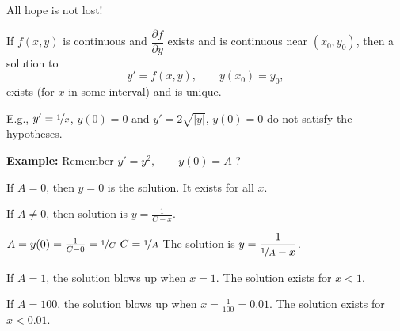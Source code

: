 \documentclass[10pt,aspectratio=169]{beamer}
\begin{document}
\begin{frame}
All hope is not lost!

\pause

\begin{theorem}%
If $f(x,y)$ is continuous and $\dfrac{\partial f}{\partial y}$ exists and is
continuous near $(x_0,y_0)$, then a solution to
\begin{equation*}
y' = f(x,y), \qquad y(x_0) = y_0,
\end{equation*}
exists (for $x$ in some interval) and is unique.
\end{theorem}

\pause

E.g., \quad $y' = \nicefrac{1}{x}$, $y(0) = 0$
\quad and \quad $y' = 2 \sqrt{\lvert y \rvert}$, $y(0) = 0$ \quad
do not satisfy the hypotheses.

\medskip
\pause

\textbf{Example:}
Remember
\quad
$
y' = y^2, \qquad y(0) = A$ \quad ?

\medskip
\pause

If $A=0$, then $y=0$ is the solution.  It exists for all $x$.

\medskip
\pause

If $A\not=0$, then solution is $y=\frac{1}{C-x}$.

\medskip
\pause

$A = y(0) = \frac{1}{C-0} = \nicefrac{1}{C}$
\pause
\wthus
$C=\nicefrac{1}{A}$
\pause
\wthus
The solution is
$\displaystyle
y = \frac{1}{\nicefrac{1}{A} - x}$.

\medskip
\pause

If $A=1$, the solution blows up when $x=1$.
The solution exists for $x < 1$.

\medskip
\pause

If $A=100$, the solution blows up when $x=\frac{1}{100}=0.01$.
The solution exists for $x < 0.01$.
\end{frame}
\end{document}
